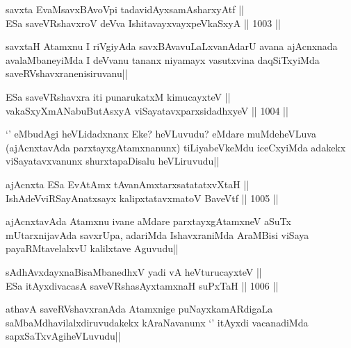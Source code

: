 \begin{shl}
savxta EvaMsavxBAvoV\s pi tadavidAyxsamAsharxyAtf || \\
ESa saveVRshavxroV deVva IshitavayxvayxpeVkaSxyA ||  1003 ||  
\end{shl}

\begin{artha}
savxtaH Atamxnu I riVgiyAda savxBAvavuLaLxvanAdarU avana ajAcnxnada avalaMbaneyiMda I deVvanu tananx niyamayx vasutxvina daqSiTxyiMda saveRVshavxranenisiruvanu||
\end{artha}


\begin{shl}
ESa saveVRshavxra iti punarukatxM kimucayxteV || \\
vakaSxyXmANabuButAsxyA viSayatavxparxsidadhxyeV ||  1004 ||  
\end{shl}

\begin{artha}
`\stext' eMbudAgi heVLidadxnanx Eke? heVLuvudu? eMdare muMdeheVLuva (ajAcnxtavAda parxtayxgAtamxnanunx) tiLiyabeVkeMdu iceCxyiMda adakekx viSayatavxvanunx shurxtapaDisalu heVLiruvudu||
\end{artha}

\begin{shl}
ajAcnxta ESa EvA\s \s tAmx tAvanAmxtarxsatatatxvXtaH || \\
IshAdeVviRSayAnatxsayx kalipxtatavxmatoV BaveVtf ||  1005 ||  
\end{shl}

\begin{artha}
ajAcnxtavAda Atamxnu ivane aMdare parxtayxgAtamxneV aSuTx mUtarxnijavAda savxrUpa, adariMda IshavxraniMda AraMBisi viSaya payaRMtavelalxvU kalilxtave Aguvudu||
\end{artha}

\begin{shl}
sAdhAvxdayxnaBisaMbanedhxV yadi vA heVturucayxteV || \\
ESa itAyxdivacasA saveVRshasAyx\s \s tamxnaH suPxTaH ||  1006 ||  
\end{shl}

\begin{artha}
athavA saveRVshavxranAda Atamxnige puNayxkamARdigaLa saMbaMdhavilalxdiruvudakekx kAraNavanunx `\stext' itAyxdi vacanadiMda sapxSaTxvAgiheVLuvudu||
\end{artha}


